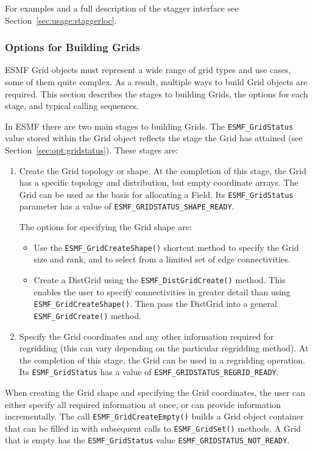 For examples and a full description of the stagger interface 
see Section~\ref{sec:usage:staggerloc}. 

\subsubsection{Options for Building Grids} 

ESMF Grid objects must represent a wide range of grid types 
and use cases, some of them quite complex.  As a result, multiple
ways to build Grid objects are required.  This section describes
the stages to building Grids, the options for each stage, and 
typical calling sequences.

In ESMF there are two main stages to building Grids.  The
{\tt ESMF\_GridStatus} value stored within the Grid object reflects
the stage the Grid has attained (see Section~\ref{sec:opt:gridstatus}).
These stages are:

\begin{enumerate}

\item Create the Grid topology or shape.  At the completion of this
stage, the Grid has a specific topology and distribution, but
empty coordinate arrays.  The Grid can be used as the basis for
allocating a Field.  Its {\tt ESMF\_GridStatus} parameter has 
a value of {\tt ESMF\_GRIDSTATUS\_SHAPE\_READY}.  

The options for specifying the Grid shape are:
\begin{itemize}
\item Use the {\tt ESMF\_GridCreateShape()} shortcut method to 
specify the Grid size and rank, and to select from a limited set
of edge connectivities.   
\item Create a DistGrid using the {\tt ESMF\_DistGridCreate()}
method.  This enables the user to specify connectivities in 
greater detail than using {\tt ESMF\_GridCreateShape()}.  Then
pass the DistGrid into a general {\tt ESMF\_GridCreate()} method.
\end{itemize}

\item Specify the Grid coordinates and any other information
required for regridding (this can vary depending on the particular
regridding method).  At the completion of this stage, the Grid can
be used in a regridding operation.  Its {\tt ESMF\_GridStatus}
has a value of {\tt ESMF\_GRIDSTATUS\_REGRID\_READY}.
\end{enumerate}

When creating the Grid shape and specifying the Grid coordinates,
the user can either specify all required information at once,
or can provide information incrementally.  The call
{\tt ESMF\_GridCreateEmpty()} builds a Grid object
container that can be filled in with subsequent calls to 
{\tt ESMF\_GridSet()} methods.  A Grid that is empty
has the {\tt ESMF\_GridStatus} value
{\tt ESMF\_GRIDSTATUS\_NOT\_READY}.

